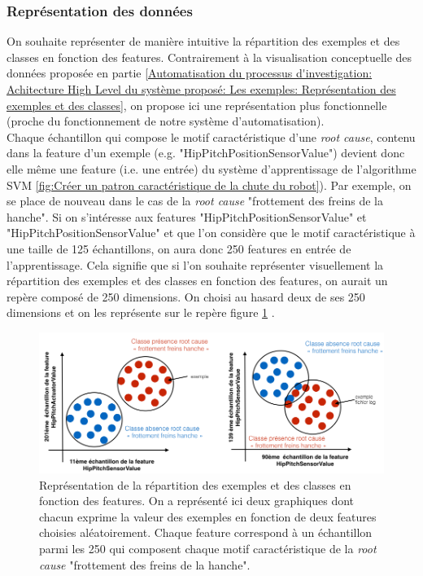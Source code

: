 \subsubsection{Représentation des données}
\label{Automatisation du processus d'investigation: Reconnaissance de motifs: Représentation des données}
On souhaite représenter de manière intuitive la répartition des exemples et des classes en fonction des features. Contrairement à la visualisation conceptuelle des données proposée en partie \ref{Automatisation du processus d'investigation: Achitecture High Level du système proposé: Les exemples: Représentation des exemples et des classes}, on propose ici une représentation plus fonctionnelle (proche du fonctionnement de notre système d'automatisation). \\
Chaque échantillon qui compose le motif caractéristique d'une \emph{root cause}, contenu dans la feature d'un exemple (e.g. "HipPitchPositionSensorValue") devient donc elle même une feature (i.e. une entrée) du système d'apprentissage de l'algorithme SVM \ref{fig:Créer un patron caractéristique de la chute du robot}). Par exemple, on se place de nouveau dans le cas de la \emph{root cause} "frottement des freins de la hanche". Si on s'intéresse aux features "HipPitchPositionSensorValue" et "HipPitchPositionSensorValue" et que l'on considère que le motif caractéristique à une taille de 125 échantillons, on aura donc 250 features en entrée de l'apprentissage. Cela signifie que si l'on souhaite représenter visuellement la répartition des exemples et des classes en fonction des features, on aurait un repère composé de 250 dimensions. On choisi au hasard deux de ses 250 dimensions et on les représente sur le repère figure 	\ref{fig:Courbe de probabilité de la root cause "frottement des freins de la hanche"} .

\begin{figure}[h]
	\centering\includegraphics[width=12cm]{images/classes_sys.png}
	\caption[Représentation de la répartition des exemples et des classes en fonction des features,  approche fonctionnelle]{Représentation de la répartition des exemples et des classes en fonction des features. On a représenté ici deux graphiques dont chacun exprime la valeur des exemples en fonction de deux features choisies aléatoirement. Chaque feature correspond à un échantillon parmi les 250 qui composent chaque motif caractéristique de la \emph{root cause} "frottement des freins de la hanche".}
	\label{fig:Courbe de probabilité de la root cause "frottement des freins de la hanche"}
\end{figure}



